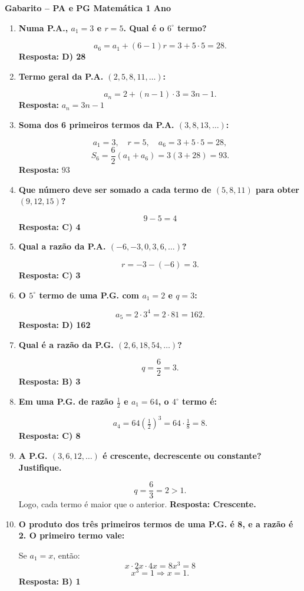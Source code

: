 \documentclass[11pt]{article}
\begin{document}
\begin{center}
    {\Large \textbf{Gabarito -- PA e PG Matemática 1 Ano }} \\
    \vspace{0.3cm}
\end{center}

\begin{enumerate}

\item \textbf{Numa P.A., $a_1=3$ e $r=5$. Qual é o $6^\circ$ termo?}

\[
a_6 = a_1 + (6-1)r = 3 + 5\cdot5 = 28.
\]
\textbf{Resposta: D) 28}

\item \textbf{Termo geral da P.A. $(2,5,8,11,\ldots)$:}

\[
a_n = 2 + (n-1)\cdot3 = 3n - 1.
\]
\textbf{Resposta: } \(a_n=3n-1\)

\item \textbf{Soma dos 6 primeiros termos da P.A. $(3,8,13,\ldots)$:}

\[
a_1=3, \quad r=5,\quad a_6=3+5\cdot5=28,
\]
\[
S_6=\frac{6}{2}(a_1+a_6)=3(3+28)=93.
\]
\textbf{Resposta: } \(93\)

\item \textbf{Que número deve ser somado a cada termo de $(5,8,11)$ para obter $(9,12,15)$?}

\[
9 - 5 = 4
\]
\textbf{Resposta: C) 4}

\item \textbf{Qual a razão da P.A. $(-6,-3,0,3,6,\ldots)$?}

\[
r = -3 - (-6) = 3.
\]
\textbf{Resposta: C) 3}

\item \textbf{O $5^\circ$ termo de uma P.G. com $a_1=2$ e $q=3$:}

\[
a_5 = 2 \cdot 3^{4} = 2 \cdot 81 = 162.
\]
\textbf{Resposta: D) 162}

\item \textbf{Qual é a razão da P.G. $(2,6,18,54,\ldots)$?}

\[
q=\frac{6}{2}=3.
\]
\textbf{Resposta: B) 3}

\item \textbf{Em uma P.G. de razão $\frac12$ e $a_1=64$, o $4^\circ$ termo é:}

\[
a_4 = 64\left(\tfrac12\right)^3 = 64 \cdot \tfrac18 = 8.
\]
\textbf{Resposta: C) 8}

\item \textbf{A P.G. $(3,6,12,\ldots)$ é crescente, decrescente ou constante? Justifique.}

\[
q = \frac{6}{3} = 2 > 1.
\]
Logo, cada termo é maior que o anterior.  
\textbf{Resposta: Crescente.}

\item \textbf{O produto dos três primeiros termos de uma P.G. é 8, e a razão é 2. O primeiro termo vale:}

Se \(a_1 = x\), então:
\[
x \cdot 2x \cdot 4x = 8x^3 = 8
\]
\[
x^3 = 1 \Rightarrow x = 1.
\]
\textbf{Resposta: B) 1}

\end{enumerate}
\end{document}
